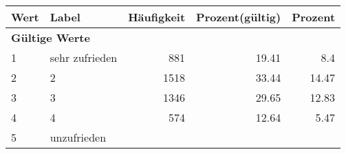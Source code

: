      \begin{longtable}{lXrrr}
     \toprule
     \textbf{Wert} & \textbf{Label} & \textbf{Häufigkeit} & \textbf{Prozent(gültig)} & \textbf{Prozent} \\
     \endhead
     \midrule
     \multicolumn{5}{l}{\textbf{Gültige Werte}}\\

     1 &
     \multicolumn{1}{X}{ sehr zufrieden   } &


       \num{881} &
       \num[round-mode=places,round-precision=2]{19,41} &
         \num[round-mode=places,round-precision=2]{8,4} \\

     2 &
     \multicolumn{1}{X}{ 2   } &


       \num{1518} &
       \num[round-mode=places,round-precision=2]{33,44} &
         \num[round-mode=places,round-precision=2]{14,47} \\

     3 &
     \multicolumn{1}{X}{ 3   } &


       \num{1346} &
       \num[round-mode=places,round-precision=2]{29,65} &
         \num[round-mode=places,round-precision=2]{12,83} \\

     4 &
     \multicolumn{1}{X}{ 4   } &


       \num{574} &
       \num[round-mode=places,round-precision=2]{12,64} &
         \num[round-mode=places,round-precision=2]{5,47} \\

     5 &
     \multicolumn{1}{X}{ unzufrieden   } &



\end{longtable}
